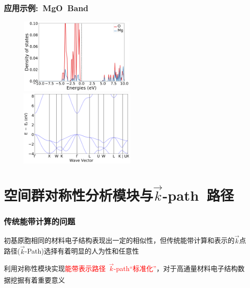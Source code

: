 \documentclass[cjk,slidestop,handout,compress,mathserif,blue]{beamer}	%
\newcommand{\upcite}[1]{\hspace{0ex}\textsuperscript{\cite{#1}}} %
\begin{document}
\frame
{
	\frametitle{应用示例:~\textrm{MgO~Band}}
\begin{figure}[h!]
\centering
\vspace*{-0.2in}
\includegraphics[height=1.5in,width=2.3in,viewport=0 0 900 600,clip]{Figures/Atomate_MgO-DOS.png}
\vskip 1pt
\includegraphics[height=1.5in,width=2.3in,viewport=0 0 900 600,clip]{Figures/Atomate_MgO-Band.png}
\label{Atomate_MgO-DOS}
\end{figure} 
}


\section{空间群对称性分析模块与$\vec k$-\rm{path~}路径}
\frame
{
	\frametitle{传统能带计算的问题}
	初基原胞相同的材料电子结构表现出一定的相似性，但传统能带计算和表示的$\vec k$点路径($\vec k$-\textrm{Path})选择有着明显的人为性和任意性
\begin{figure}[h!]
\centering
\hspace*{-0.30in}
\label{Band_Gap_BCC_GeF4}
\end{figure}
利用对称性模块实现\textcolor{red}{能带表示路径~$\vec k$-\textrm{path}“标准化”}，对于高通量材料电子结构数据挖掘有着重要意义\upcite{CMS49-299_2010}
}
\end{document}
